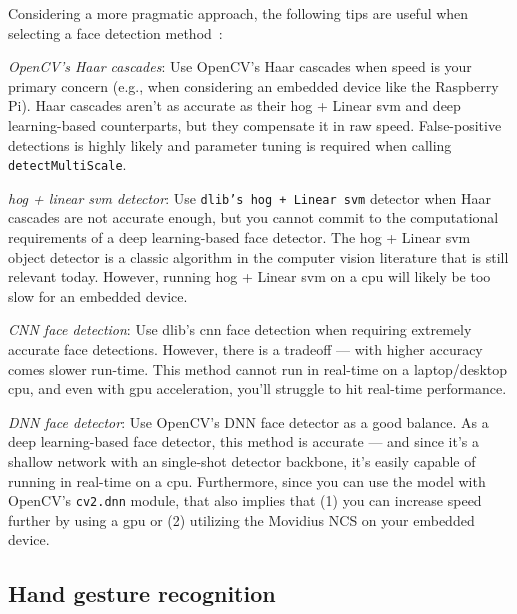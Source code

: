 Considering a more pragmatic approach, the following tips are useful when
selecting a face detection method~\cite{pyimage-face-bestpractices}:
\begin{enum-c}
\item \emph{OpenCV's Haar cascades}:
      Use OpenCV's Haar cascades when speed is your primary concern (e.g., when
      considering an embedded device like the Raspberry Pi). Haar cascades
      aren't as accurate as their \gls{hog} + Linear \gls{svm} and deep learning-based
      counterparts, but they compensate it in raw speed. False-positive
      detections is highly likely and parameter tuning is required when calling
      \texttt{detectMultiScale}.
\item \emph{\gls{hog} + linear \gls{svm} detector}:
    Use \texttt{dlib's \gls{hog} + Linear \gls{svm}} detector when Haar cascades are not
    accurate enough, but you cannot commit to the computational requirements of
    a deep learning-based face detector.
    The \gls{hog} + Linear \gls{svm} object detector is a classic algorithm in the computer
    vision literature that is still relevant today.
    However, running \gls{hog} + Linear \gls{svm} on a \gls{cpu} will likely be too slow for an
    embedded device.
  \item \emph{CNN face detection}:
    Use dlib's \gls{cnn} face detection when requiring extremely accurate face
    detections.
   However, there is a tradeoff --- with
   higher accuracy comes slower run-time.
   This method cannot run in real-time on a laptop/desktop \gls{cpu}, and even with
   \gls{gpu} acceleration, you'll struggle to hit real-time performance.
  \item \emph{DNN face detector}:
    Use OpenCV's DNN face detector as a good balance. As a deep learning-based
    face detector, this method is accurate --- and since it's a shallow network
    with an single-shot detector backbone, it's easily capable of running in
    real-time on a \gls{cpu}. Furthermore, since you can use the model with
    OpenCV's \texttt{cv2.dnn} module, that also implies that (1) you can
    increase speed further by using a \gls{gpu} or (2) utilizing the Movidius
    NCS on your embedded device.
\end{enum-c}



\subsection{Hand gesture recognition}
\label{sec:hand-gest-recogn}


